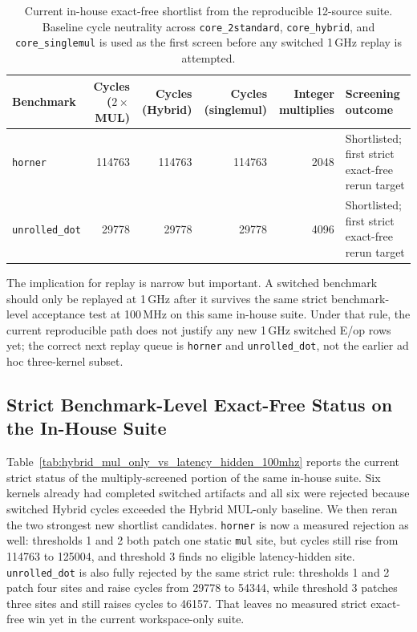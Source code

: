 \begin{table}[t]
\centering
\caption{Current in-house exact-free shortlist from the reproducible 12-source suite. Baseline cycle neutrality across \texttt{core\_2standard}, \texttt{core\_hybrid}, and \texttt{core\_singlemul} is used as the first screen before any switched 1\,GHz replay is attempted.}
\label{tab:exactfree_1ghz}
\small
\begin{tabular}{lrrrrl}
\toprule
Benchmark & Cycles ($2\!\times\!$MUL) & Cycles (Hybrid) & Cycles (singlemul) & Integer multiplies & Screening outcome \\
\midrule
\texttt{horner} & 114763 & 114763 & 114763 & 2048 & Shortlisted; first strict exact-free rerun target \\
\texttt{unrolled\_dot} & 29778 & 29778 & 29778 & 4096 & Shortlisted; first strict exact-free rerun target \\
\bottomrule
\end{tabular}
\end{table}

The implication for replay is narrow but important. A switched benchmark
should only be replayed at 1\,GHz after it survives the same strict
benchmark-level acceptance test at 100\,MHz on this same in-house
suite. Under that rule, the current reproducible path does not justify
any new 1\,GHz switched E/op rows yet; the correct next replay queue is
\texttt{horner} and \texttt{unrolled\_dot}, not the earlier ad hoc
three-kernel subset.

\subsection{Strict Benchmark-Level Exact-Free Status on the In-House Suite}
\label{sec:eval:hybrid_mul_only_exactfree}

Table~\ref{tab:hybrid_mul_only_vs_latency_hidden_100mhz} reports the
current strict status of the multiply-screened portion of the same
in-house suite. Six kernels already had completed switched artifacts
and all six were rejected because switched Hybrid cycles exceeded the
Hybrid MUL-only baseline. We then reran the two strongest new shortlist
candidates. \texttt{horner} is now a measured rejection as well:
thresholds 1 and 2 both patch one static \texttt{mul} site, but cycles
still rise from 114763 to 125004, and threshold 3 finds no eligible
latency-hidden site. \texttt{unrolled\_dot} is also fully rejected by
the same strict rule: thresholds 1 and 2 patch four sites and raise
cycles from 29778 to 54344, while threshold 3 patches three sites and
still raises cycles to 46157. That leaves no measured strict exact-free
win yet in the current workspace-only suite.

